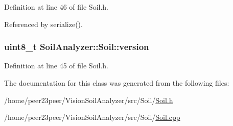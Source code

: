 Definition at line 46 of file Soil.\+h.



Referenced by serialize().

\hypertarget{class_soil_analyzer_1_1_soil_ac32132912c73338edf60b5cd6de4feb8}{}
\subsubsection[{version}]{\setlength{\rightskip}{0pt plus 5cm}uint8\+\_\+t Soil\+Analyzer\+::\+Soil\+::version}\label{class_soil_analyzer_1_1_soil_ac32132912c73338edf60b5cd6de4feb8}


Definition at line 45 of file Soil.\+h.



The documentation for this class was generated from the following files\+:\begin{DoxyCompactItemize}
\item 
/home/peer23peer/\+Vision\+Soil\+Analyzer/src/\+Soil/\hyperlink{_soil_8h}{Soil.\+h}\item 
/home/peer23peer/\+Vision\+Soil\+Analyzer/src/\+Soil/\hyperlink{_soil_8cpp}{Soil.\+cpp}\end{DoxyCompactItemize}
